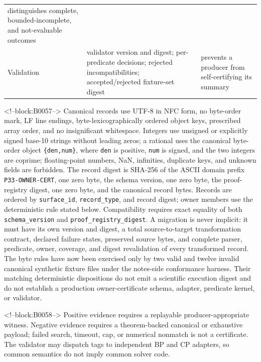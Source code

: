 \documentclass[11pt,a4paper]{article}
\begin{document}
\begin{longtable}[]{@{}lll@{}}
\begin{minipage}[t]{0.30\columnwidth}
distinguishes complete, bounded-incomplete, and not-evaluable outcomes\strut
\end{minipage}\tabularnewline
\begin{minipage}[t]{0.30\columnwidth}\raggedright
Validation\strut
\end{minipage} & \begin{minipage}[t]{0.30\columnwidth}\raggedright
validator version and digest; per-predicate decisions; rejected incompatibilities; accepted/rejected fixture-set digest\strut
\end{minipage} & \begin{minipage}[t]{0.30\columnwidth}\raggedright
prevents a producer from self-certifying its summary\strut
\end{minipage}\tabularnewline
\bottomrule
\end{longtable}

<!--block:B0057-->
Canonical records use UTF-8 in NFC form, no byte-order mark, LF line endings, byte-lexicographically ordered object keys, prescribed array order, and no insignificant whitespace. Integers use unsigned or explicitly signed base-10 strings without leading zeros; a rational uses the canonical byte-order object \texttt{\{den,num\}}, where \texttt{den} is positive, \texttt{num} is signed, and the two integers are coprime; floating-point numbers, NaN, infinities, duplicate keys, and unknown fields are forbidden. The record digest is SHA-256 of the ASCII domain prefix \texttt{P33-OWNER-CERT}, one zero byte, the schema version, one zero byte, the proof-registry digest, one zero byte, and the canonical record bytes. Records are ordered by \texttt{surface\_id}, \texttt{record\_type}, and record digest; owner members use the deterministic rule stated below. Compatibility requires exact equality of both \texttt{schema\_version} and \texttt{proof\_registry\_digest}. A migration is never implicit: it must have its own version and digest, a total source-to-target transformation contract, declared failure states, preserved source bytes, and complete parser, predicate, owner, coverage, and digest revalidation of every transformed record. The byte rules have now been exercised only by two valid and twelve invalid canonical synthetic fixture files under the notes-side conformance harness. Their matching deterministic dispositions do not emit a scientific execution digest and do not establish a production owner-certificate schema, adapter, predicate kernel, or validator.

<!--block:B0058-->
Positive evidence requires a replayable producer-appropriate witness. Negative evidence requires a theorem-backed canonical or exhaustive payload; failed search, timeout, cap, or numerical nonmatch is not a certificate. The validator may dispatch tags to independent BP and CP adapters, so common semantics do not imply common solver code.
\end{document}
